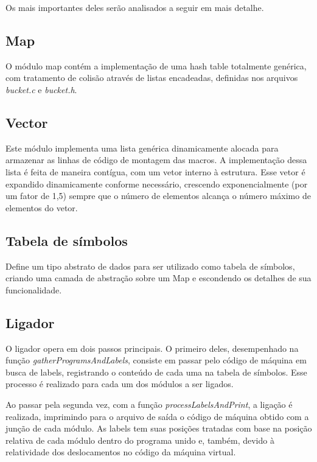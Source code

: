 \documentclass[12pt,a4paper]{article}
\numberwithin{equation}{section}
\begin{document}
Os mais importantes deles serão analisados a seguir em mais detalhe.

\subsection{Map}

O módulo map contém a implementação de uma hash table totalmente genérica, com tratamento de colisão através de listas encadeadas, definidas nos arquivos \emph{bucket.c} e \emph{bucket.h}.

\subsection{Vector}

Este módulo implementa uma lista genérica dinamicamente alocada para armazenar as linhas de código de montagem das macros. A implementação dessa lista é feita de maneira contígua, com um vetor interno à estrutura. Esse vetor é expandido dinamicamente conforme necessário, crescendo exponencialmente (por um fator de 1,5) sempre que o número de elementos alcança o número máximo de elementos do vetor.

\subsection{Tabela de símbolos}

Define um tipo abstrato de dados para ser utilizado como tabela de símbolos, criando uma camada de abstração sobre um Map e escondendo os detalhes de sua funcionalidade.

\subsection{Ligador}

O ligador opera em dois passos principais. O primeiro deles, desempenhado na função \emph{gatherProgramsAndLabels}, consiste em passar pelo código de máquina em busca de labels, registrando o conteúdo de cada uma na tabela de símbolos. Esse processo é realizado para cada um dos módulos a ser ligados. 

Ao passar pela segunda vez, com a função \emph{processLabelsAndPrint}, a ligação é realizada, imprimindo para o arquivo de saída o código de máquina obtido com a junção de cada módulo. As labels tem suas posições tratadas com base na posição relativa de cada módulo dentro do programa unido e, também, devido à relatividade dos deslocamentos no código da máquina virtual.
\end{document}

